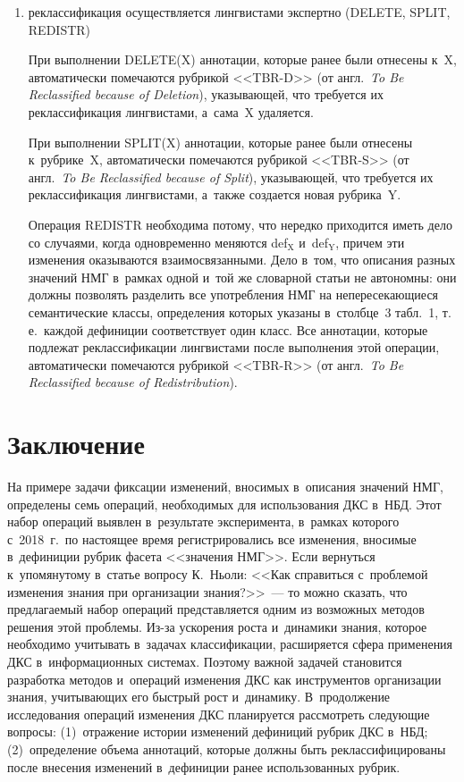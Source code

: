 \begin{multicols}{2}
\begin{enumerate}[(1)]
\item реклассификация осуществляется лингвистами 
экспертно (DELETE, SPLIT, REDISTR)

     При выполнении DELETE(X) аннотации, которые ранее были отнесены 
к~X, автоматически помечаются рубрикой <<TBR-D>> (от англ.\ \textit{To Be 
Reclassified because of Deletion}), указывающей, что требуется их 
реклассификация лингвистами, а~сама~X удаляется.
     
     При выполнении SPLIT(X) аннотации, которые ранее были отнесены 
к~рубрике~X, автоматически помечаются рубрикой <<TBR-S>> (от англ.\ 
\textit{To Be Reclassified because of Split}), указывающей, что требуется их 
реклассификация лингвистами, а~также создается новая рубрика~Y.
     
     Операция REDISTR необходима потому, что нередко приходится иметь 
дело со случаями, когда одновременно меняются def$_{\mathrm{X}}$ 
и~def$_{\mathrm{Y}}$, причем эти изменения оказываются взаимосвязанными. 
Дело в~том, что описания разных значений НМГ в~рамках одной и~той же 
словарной статьи не автономны: они должны позволять разделить все 
употребления НМГ на непересекающиеся семантические классы, определения 
которых указаны в~столбце~3 табл.~1, т.\,е.\ каждой дефиниции соответствует 
один класс. Все аннотации, которые подлежат реклассификации лингвистами 
после выполнения этой операции, автоматически помечаются рубрикой 
<<TBR-R>> (от англ.\ \textit{To Be Reclassified because of Redistribution}).
\end{enumerate}

\vspace*{-8pt}

\section{Заключение}

\vspace*{-2pt}

     На примере задачи фиксации изменений, вносимых в~описания значений 
НМГ, определены семь операций, необходимых для 
использования ДКС в~НБД. Этот набор операций выявлен в~результате 
эксперимента, в~рамках которого с~2018~г.\ по настоящее время 
регистрировались все изменения, вносимые в~дефиниции рубрик фасета 
<<значения НМГ>>. Если вернуться к~упомянутому в~статье вопросу 
К.~Ньоли: <<Как справиться с~проблемой изменения знания при 
организации знания?>>~--- то можно сказать, что предлагаемый набор 
операций представляется одним из возможных методов решения этой 
проб\-ле\-мы. Из-за ускорения роста и~динамики знания, которое необходимо 
учитывать в~задачах классификации, расширяется сфера применения ДКС 
в~информационных системах. Поэтому важной задачей становится разработка 
методов и~операций изменения ДКС как инструментов организации знания, 
учитывающих его быстрый рост и~динамику. В~продолжение исследования 
операций изменения ДКС планируется рассмотреть следующие вопросы: 
(1)~отражение истории изменений дефиниций рубрик ДКС в~НБД; 
(2)~определение объема аннотаций, которые должны быть 
реклассифицированы после внесения изменений в~дефиниции ранее 
использованных рубрик.
     

\end{multicols}

